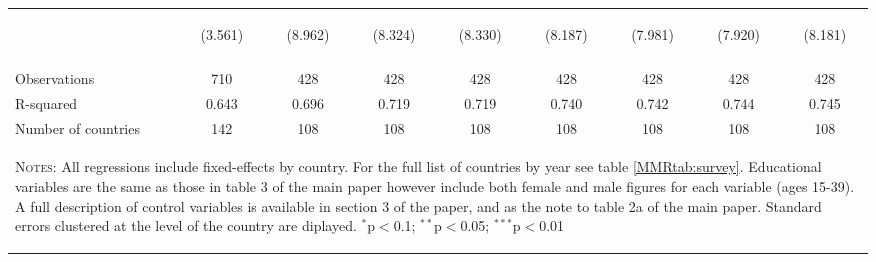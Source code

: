 \begin{landscape}
\begin{table}[htpb!]
\begin{center}
\begin{tabular}{lcccccccc}
&\begin{footnotesize}(3.561)\end{footnotesize}&\begin{footnotesize}(8.962)\end{footnotesize}&\begin{footnotesize}(8.324)\end{footnotesize}&\begin{footnotesize}(8.330)\end{footnotesize}&\begin{footnotesize}(8.187)\end{footnotesize}&\begin{footnotesize}(7.981)\end{footnotesize}&\begin{footnotesize}(7.920)\end{footnotesize}&\begin{footnotesize}(8.181)\end{footnotesize}\\
&&&&&&&&\\Observations&710&428&428&428&428&428&428&428\\
R-squared&0.643&0.696&0.719&0.719&0.740&0.742&0.744&0.745\\
Number of countries&142&108&108&108&108&108&108&108\\
\midrule
\multicolumn{9}{p{20cm}}{\begin{footnotesize}\textsc{Notes:} All regressions include fixed-effects by country. For the full list of countries by year see table \ref{MMRtab:survey}. Educational variables are the same as those in table 3 of the main paper however include both female and male figures for each variable (ages 15-39). A full description of control variables is available in section 3 of the paper, and as the note to table 2a of the main paper.  Standard errors clustered at the level of the country are diplayed.
$^{*}$p$<$0.1; $^{**}$p$<$0.05; $^{***}$p$<$0.01\end{footnotesize}} \\ \bottomrule 
\end{tabular}\end{center}\end{table}\end{landscape}
